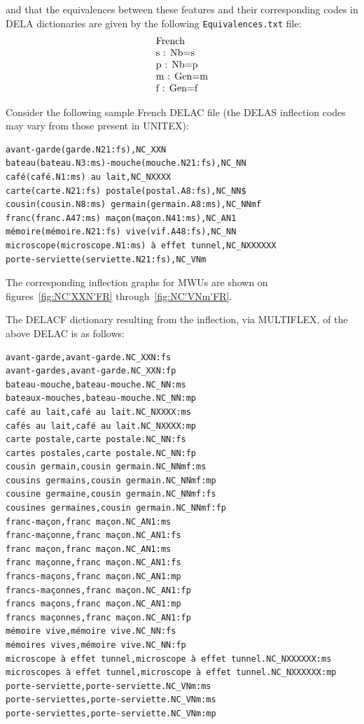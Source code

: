 \bigskip
\noindent and that the equivalences between these features and their corresponding codes 
in DELA dictionaries are given by the following \verb+Equivalences.txt+ file: 
\[
\begin{array}[l]{l}
$French$ \\
$s : Nb=s$ \\
$p : Nb=p$ \\
$m : Gen=m$ \\
$f : Gen=f$
\end{array}
\]

\bigskip
\noindent Consider the following sample French DELAC file (the DELAS inflection codes may 
vary from those present in UNITEX):

\begin{verbatim}
avant-garde(garde.N21:fs),NC_XXN
bateau(bateau.N3:ms)-mouche(mouche.N21:fs),NC_NN
café(café.N1:ms) au lait,NC_NXXXX
carte(carte.N21:fs) postale(postal.A8:fs),NC_NN$
cousin(cousin.N8:ms) germain(germain.A8:ms),NC_NNmf
franc(franc.A47:ms) maçon(maçon.N41:ms),NC_AN1
mémoire(mémoire.N21:fs) vive(vif.A48:fs),NC_NN
microscope(microscope.N1:ms) à effet tunnel,NC_NXXXXXX
porte-serviette(serviette.N21:fs),NC_VNm
\end{verbatim}


\bigskip
\noindent The corresponding inflection graphs for MWUs are shown on figures~\ref{fig:NC'XXN'FR} 
through~\ref{fig:NC'VNm'FR}. 

\bigskip
\noindent The DELACF dictionary resulting from the inflection, via MULTIFLEX, of the above 
DELAC is as follows:

\begin{verbatim}
avant-garde,avant-garde.NC_XXN:fs
avant-gardes,avant-garde.NC_XXN:fp
bateau-mouche,bateau-mouche.NC_NN:ms
bateaux-mouches,bateau-mouche.NC_NN:mp
café au lait,café au lait.NC_NXXXX:ms
cafés au lait,café au lait.NC_NXXXX:mp
carte postale,carte postale.NC_NN:fs
cartes postales,carte postale.NC_NN:fp
cousin germain,cousin germain.NC_NNmf:ms
cousins germains,cousin germain.NC_NNmf:mp
cousine germaine,cousin germain.NC_NNmf:fs
cousines germaines,cousin germain.NC_NNmf:fp
franc-maçon,franc maçon.NC_AN1:ms
franc-maçonne,franc maçon.NC_AN1:fs
franc maçon,franc maçon.NC_AN1:ms
franc maçonne,franc maçon.NC_AN1:fs
francs-maçons,franc maçon.NC_AN1:mp
francs-maçonnes,franc maçon.NC_AN1:fp
francs maçons,franc maçon.NC_AN1:mp
francs maçonnes,franc maçon.NC_AN1:fp
mémoire vive,mémoire vive.NC_NN:fs
mémoires vives,mémoire vive.NC_NN:fp
microscope à effet tunnel,microscope à effet tunnel.NC_NXXXXXX:ms
microscopes à effet tunnel,microscope à effet tunnel.NC_NXXXXXX:mp
porte-serviette,porte-serviette.NC_VNm:ms
porte-serviettes,porte-serviette.NC_VNm:ms
porte-serviettes,porte-serviette.NC_VNm:mp 
\end{verbatim}


